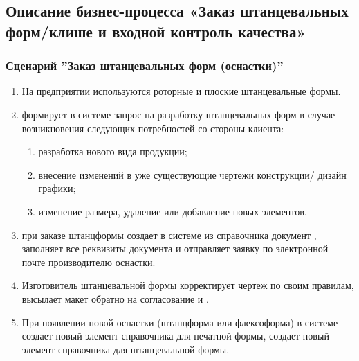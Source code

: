 \subsection{Описание бизнес-процесса «Заказ штанцевальных форм/клише и входной контроль качества»}

\label{bp:toolrequest}

\subsubsection{Сценарий ''Заказ штанцевальных форм  (оснастки)''}
\label{bp:toolrequest_1}

\begin{enumerate}

\item На предприятии используются роторные и плоские штанцевальные формы.
\item \tehnolog	 формирует в системе \gofro запрос на разработку штанцевальных форм в случае возникновения следующих потребностей со стороны клиента:
\begin{enumerate}
\item   	разработка нового вида продукции;
\item   	внесение изменений в уже существующие чертежи конструкции/ дизайн графики;
\item   	изменение размера, удаление или добавление новых элементов.
\end{enumerate}

\item \constructor	при заказе штанцформы  создает в системе \gofro из справочника  документ , \constructor заполняет все реквизиты документа и отправляет заявку по электронной почте производителю оснастки.


\item   Изготовитель штанцевальной формы корректирует чертеж по своим правилам, высылает макет обратно на согласование \constructor и \manager. 
\item	При появлении новой оснастки (штанцформа или флексоформа)  в системе \gofro \tehnolog создает новый элемент справочника  для печатной формы, \tehnolog создает новый элемент справочника  для штанцевальной формы.

\end{enumerate}


